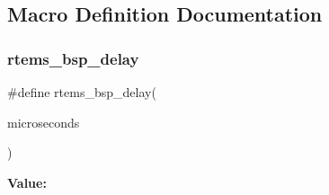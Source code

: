 \subsection{Macro Definition Documentation}
\mbox{\label{group__RTEMSBSPsBfinBF537Stamp_gaa227a93db3561a86689137fbd6e10101}} 
\subsubsection{\texorpdfstring{rtems\_bsp\_delay}{rtems\_bsp\_delay}}
{\footnotesize\ttfamily \#define rtems\+\_\+bsp\+\_\+delay(\begin{DoxyParamCaption}\item[{}]{microseconds }\end{DoxyParamCaption})}

{\bfseries Value\+:}
\begin{DoxyCode}{0}
\DoxyCodeLine{\{ \(\backslash\)}
\DoxyCodeLine{  \}}

\end{DoxyCode}
